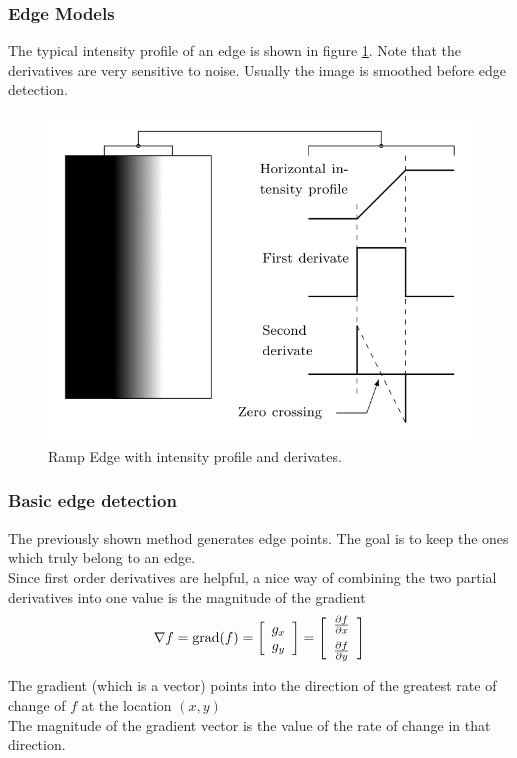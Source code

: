 \subsubsection{Edge Models}

The typical intensity profile of an edge is shown in figure \ref{fig:imseg_edgemodels}.
Note that the derivatives are very sensitive to noise. Usually the image is smoothed before
edge detection.

\begin{figure}[!h]
	\centering
	\includegraphics[width=.5\linewidth]{tikz/segmentation/EdgeModelsRamp.png}
	\caption{Ramp Edge with intensity profile and derivates.}
	\label{fig:imseg_edgemodels}
\end{figure}

\subsubsection{Basic edge detection}
The previously shown method generates edge points. The goal is to keep the ones which truly belong to an edge.\\
Since first order derivatives are helpful, a nice way of combining the two partial derivatives into one value is the magnitude of the gradient
\begin{equation}
	\nabla f = \text{grad}(f) = \left[\begin{array}{c} g_x \\ g_y \end{array}\right] =  \left[\displaystyle{\begin{array}{c} \frac{\partial f}{\partial x} \vspace{0.2cm}  \\ \frac{\partial f}{\partial y} \end{array}}\right] \notag
\end{equation}

The gradient (which is a vector) points into the direction of the greatest rate of change of $f$ at the location $(x,y)$\\
The magnitude of the gradient vector is the value of the rate of change in that direction. \\

